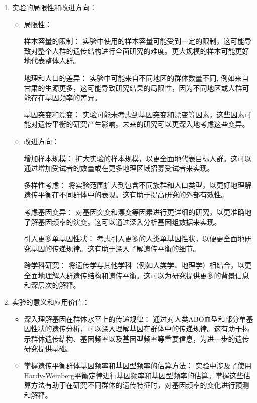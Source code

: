 \documentclass[AutoFakeBold]{LZUThesis}
\begin{document}
\begin{enumerate}
\begin{enumerate}
    \item 实验的局限性和改进方向：
    
    \begin{itemize}
        \item 局限性：
        
        样本容量的限制： 实验中使用的样本容量可能受到一定的限制，这可能导致对整个人群的遗传结构进行全面研究的难度。更大规模的样本可能更好地代表整体人群。

        地理和人口的差异： 实验中可能来自不同地区的群体数量不同, 例如来自甘肃的生源更多，这可能导致研究结果的局限性，因为不同地区或人群可能存在基因频率的差异。

        基因突变和漂变： 实验可能未考虑到基因突变和漂变等因素，这些因素可能对遗传平衡的研究产生影响。未来的研究可以更深入地考虑这些变异。

        \item 改进方向：
        
        增加样本规模： 扩大实验的样本规模，以更全面地代表目标人群。这可以通过增加受试者的数量或在更多地理区域招募受试者来实现。

        多样性考虑： 将实验范围扩大到包含不同族群和人口类型，以更好地理解遗传平衡在不同群体中的表现。这有助于提高研究的外部有效性。

        考虑基因变异： 对基因突变和漂变等因素进行更详细的研究，以更准确地了解基因频率的演变。这可以通过深入分析基因组数据来实现。

        引入更多单基因性状： 考虑引入更多的人类单基因性状，以便更全面地研究基因的传递规律。这有助于深入了解遗传平衡的细节。

        跨学科研究： 将遗传学与其他学科（例如人类学、地理学）相结合，以更全面地理解人群遗传结构和遗传平衡。这可以为研究提供更多的背景信息和深层次的解释。
    \end{itemize}
    
    \item 实验的意义和应用价值：
    
    \begin{itemize}
        \item 深入理解基因在群体水平上的传递规律： 通过对人类ABO血型和部分单基因性状的遗传分析，可以深入理解基因在群体中的传递规律。这有助于揭示群体遗传结构、基因频率以及基因型频率等重要信息，为进一步的遗传研究提供基础。

        \item 掌握遗传平衡群体基因频率和基因型频率的估算方法： 实验中涉及了使用Hardy-Weinberg平衡定律进行基因频率和基因型频率的估算。掌握这些估算方法有助于在研究不同群体的遗传特征时，对基因频率的变化进行预测和解释。


\end{itemize}
\end{enumerate}
\end{enumerate}
\end{document}
